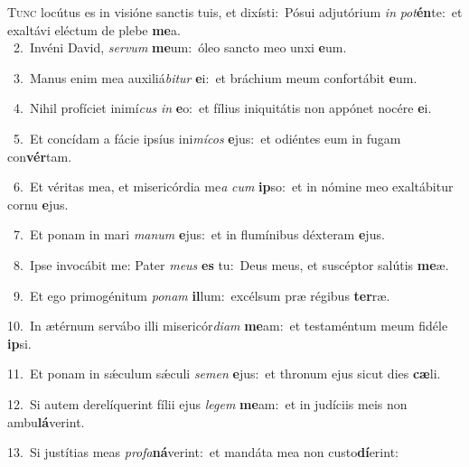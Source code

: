 \lettrine{\initial\textcolor{\initialcolor}{T}}{unc} locútus es in visióne sanctis tuis, et dixísti:~\dagger Pósui adjutórium \textit{in} \textit{pot}\-\textbf{én}te:~\star et exaltávi eléctum de plebe \textbf{me}\-a.\\
{\numbfont\textcolor{\numbcolor}{~2.}}~Invéni David, \textit{ser}\-\textit{vum} \textbf{me}\-um:~\star óleo sancto meo unxi \textbf{e}\-um.\par
{\numbfont\textcolor{\numbcolor}{~3.}}~Manus enim mea auxiliá\-\textit{bi}\-\textit{tur} \textbf{e}\-i:~\star et bráchium meum confortábit \textbf{e}\-um.\par
{\numbfont\textcolor{\numbcolor}{~4.}}~Nihil profíciet inimí\textit{cus} \textit{in} \textbf{e}\-o:~\star et fílius iniquitátis non appónet nocére \textbf{e}\-i.\par
{\numbfont\textcolor{\numbcolor}{~5.}}~Et concídam a fácie ipsíus ini\-\textit{mí}\-\textit{cos} \textbf{e}\-jus:~\star et odiéntes eum in fugam con\-\textbf{vér}\-tam.\par
{\numbfont\textcolor{\numbcolor}{~6.}}~Et véritas mea, et misericórdia me\textit{a} \textit{cum} \textbf{ip}\-so:~\star et in nómine meo exaltábitur cornu \textbf{e}\-jus.\par
{\numbfont\textcolor{\numbcolor}{~7.}}~Et ponam in mari \textit{ma}\-\textit{num} \textbf{e}\-jus:~\star et in flumínibus déxteram \textbf{e}\-jus.\par
{\numbfont\textcolor{\numbcolor}{~8.}}~Ipse invocábit me: Pater \textit{me}\-\textit{us} \textbf{es} tu:~\star Deus meus, et suscéptor salútis \textbf{me}\-æ.\par
{\numbfont\textcolor{\numbcolor}{~9.}}~Et ego primogénitum \textit{po}\-\textit{nam} \textbf{il}\-lum:~\star excélsum præ régibus \textbf{ter}\-ræ.\par
{\numbfont\textcolor{\numbcolor}{10.}}~In ætérnum servábo illi misericór\-\textit{di}\-\textit{am} \textbf{me}\-am:~\star et testaméntum meum fidéle \textbf{ip}\-si.\par
{\numbfont\textcolor{\numbcolor}{11.}}~Et ponam in sǽculum sǽculi \textit{se}\-\textit{men} \textbf{e}\-jus:~\star et thronum ejus sicut dies \textbf{cæ}\-li.\par
{\numbfont\textcolor{\numbcolor}{12.}}~Si autem derelíquerint fílii ejus \textit{le}\-\textit{gem} \textbf{me}\-am:~\star et in judíciis meis non ambu\-\textbf{lá}\-verint.\par
{\numbfont\textcolor{\numbcolor}{13.}}~Si justítias meas \textit{pro}\-\textit{fa}\textbf{ná}verint:~\star et mandáta mea non custo\-\textbf{dí}\-erint:\par
